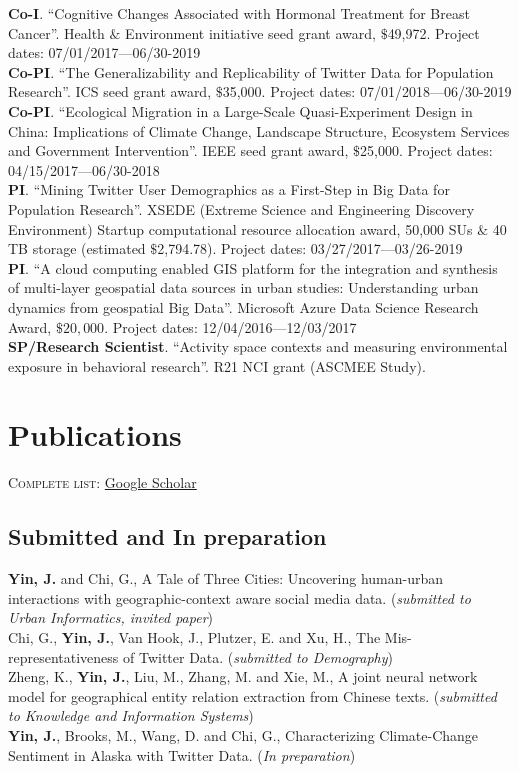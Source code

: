\documentclass[11pt, a4paper]{article}
\newcommand{\years}[1]{\marginnote{\scriptsize #1}}
\begin{document}
\textbf{Co-I}. ``Cognitive Changes Associated with Hormonal Treatment for Breast Cancer''. Health $\&$ Environment initiative seed grant award, $\$$49,972. Project dates: 07/01/2017—06/30-2019\\
\textbf{Co-PI}. ``The Generalizability and Replicability of Twitter Data for Population Research''. ICS seed grant award, $\$$35,000. Project dates: 07/01/2018—06/30-2019\\
\textbf{Co-PI}. ``Ecological Migration in a Large-Scale Quasi-Experiment Design in China: Implications of Climate Change, Landscape Structure, Ecosystem Services and Government Intervention''. IEEE seed grant award, $\$$25,000. Project dates: 04/15/2017—06/30-2018\\
\textbf{PI}. ``Mining Twitter User Demographics as a First-Step in Big Data for Population Research''. XSEDE (Extreme Science and Engineering Discovery Environment) Startup computational resource allocation award, 50,000 SUs $\&$ 40 TB storage (estimated $\$$2,794.78). Project dates: 03/27/2017—03/26-2019\\
\textbf{PI}. ``A cloud computing enabled GIS platform for the integration and synthesis of multi-layer geospatial data sources in urban studies: Understanding urban dynamics from geospatial Big Data''. Microsoft Azure Data Science Research Award, $\$20,000$. Project dates: 12/04/2016—12/03/2017\\
\textbf{SP/Research Scientist}. ``Activity space contexts and measuring environmental exposure in behavioral research''. R21 NCI grant (ASCMEE Study).

\section*{Publications}
\textsc{Complete list}: \href{https://scholar.google.com/citations?hl=en&user=LW01O2YAAAAJ&view_op=list_works&sortby=pubdate}{Google Scholar}
\subsection*{Submitted and In preparation}
\years{2022} \textbf{Yin, J.} and Chi, G., A Tale of Three Cities: Uncovering human-urban interactions with geographic-context aware social media data. (\textit{submitted to Urban Informatics, invited paper})\\
\years{2022}Chi, G., \textbf{Yin, J.}, Van Hook,  J., Plutzer, E. and Xu, H., The Mis-representativeness of Twitter Data. (\textit{submitted to Demography})\\
\years{2022}Zheng, K., \textbf{Yin, J.}, Liu, M., Zhang, M. and Xie, M., A joint neural network model for geographical entity relation extraction from Chinese texts. (\textit{submitted to Knowledge and Information Systems})\\
\years{2022} \textbf{Yin, J.},  Brooks, M., Wang, D. and Chi, G., Characterizing Climate-Change Sentiment in Alaska with Twitter Data. (\textit{In preparation})\\
\end{document}
